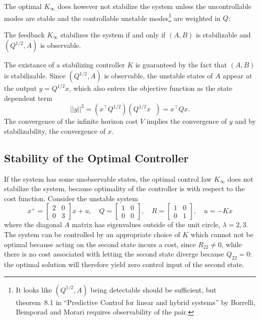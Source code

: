 The optimal $K_\infty$ does however not stabilize the system unless the uncontrollable modes are stable and the controllable unstable modes\footnote{It looks like $(Q^{1/2},A)$ being detectable should be sufficient, but theorem~8.1 in ``Predictive Control for linear and hybrid systems'' by Borrelli, Bemporad and Morari requires observability of the pair.} are weighted in $Q$:
\begin{theorem}
  The feedback $K_\infty$ stabilizes the system if and only if $(A,B)$ is stabilizable and $(Q^{1/2},A)$ is observable.
\end{theorem}
The existance of a stabilizing controller $K$ is guaranteed by the fact that $(A,B)$ is stabilizable. Since $(Q^{1/2},A)$ is observable, the unstable states of $A$ appear at the output $y=Q^{1/2}x$, which also enters the objective function as the state dependent term
\begin{equation*}
  ||y||^2 = \left(x^\top Q^{1/2}\right)\left(Q^{1/2} x^{\phantom{\top}}\right) = x^\top Qx.
\end{equation*}
The convergence of the infinite horizon cost $V$ implies the convergence of $y$ and by stabilizability, the convergence of $x$.


\subsection{Stability of the Optimal Controller}
\label{sec:stability-optimal-controller}

If the system has some unobservable states, the optimal control law $K_\infty$ does not stabilize the system, because optimality of the controller is with respect to the cost function. Consider the unstable system
\begin{equation*}
  x^+ =
  \begin{bmatrix}
    2 & 0 \\ 0 & 3
  \end{bmatrix}x + u, \quad Q =
  \begin{bmatrix}
    1 & 0 \\ 0 & 0
  \end{bmatrix}, \quad R =
  \begin{bmatrix}
    1 & 0 \\ 0 & 1
  \end{bmatrix},\quad u =-Kx
\end{equation*}
where the diagonal $A$ matrix has eigenvalues outside of the unit circle, $\lambda=2,3$. The system can be controlled by an appropriate choice of $K$ which cannot not be optimal because acting on the second state incurs a cost, since $R_{22}\neq 0$, while there is no cost associated with letting the second state diverge because $Q_{22}=0$: the optimal solution will therefore yield zero control input of the second state.


